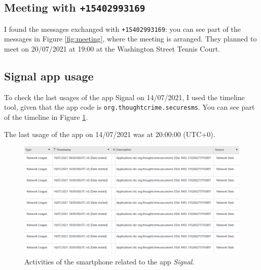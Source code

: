 \documentclass[12pt]{article}
\begin{document}
\subsection{Meeting with \texttt{+15402993169}}

I found the messages exchanged with \texttt{+15402993169}: you can see part of the messages in Figure \ref{fig:meeting}, where the meeting is arranged. They planned to meet on 20/07/2021 at 19:00 at the Washington Street Tennis Court.

\subsection{Signal app usage}

To check the last usages of the app Signal \cite{signal} on 14/07/2021, I used the timeline tool, given that the app code is \texttt{org.thoughtcrime.securesms}.
You can see part of the timeline in Figure \ref{fig:signal}.

The last usage of the app on 14/07/2021 was at 20:00:00 (UTC+0).

\begin{figure}[!ht]
    \centering
    \includegraphics[width=\textwidth]{images/signal.png}
    \caption{Activities of the smartphone related to the app \textit{Signal}.}
    \label{fig:signal}
\end{figure}

\printbibliography[title={References}]
\end{document}
